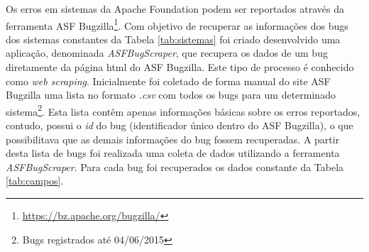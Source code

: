 \documentclass[12pt]{article}
\begin{document}
Os erros em sistemas da Apache Foundation podem ser reportados através da ferramenta ASF Bugzilla\footnote{\url{https://bz.apache.org/bugzilla/}}{}. Com objetivo de recuperar as informações dos bugs dos sistemas constantes da Tabela \ref{tab:sistemas} foi criado desenvolvido uma aplicação, denominada \textit{ASFBugScraper}, que recupera os dados de um bug diretamente da página html do ASF Bugzilla. Este tipo de processo é conhecido como \textit{web scraping}. Inicialmente foi coletado de forma manual do site ASF Bugzilla uma lista no formato \textit{.csv} com todos os bugs para um determinado sistema\footnote{Bugs registrados até 04/06/2015}. Esta lista contêm apenas informações básicas sobre os erros reportados, contudo, possui o \textit{id} do bug (identificador único dentro do ASF Bugzilla), o que possibilitava que as demais informações do bug fossem recuperadas. A partir desta lista de bugs foi realizada uma coleta de dados utilizando a ferramenta \textit{ASFBugScraper}. Para cada bug foi recuperados os dados constante da Tabela \ref{tab:campos}{}.
\end{document}
